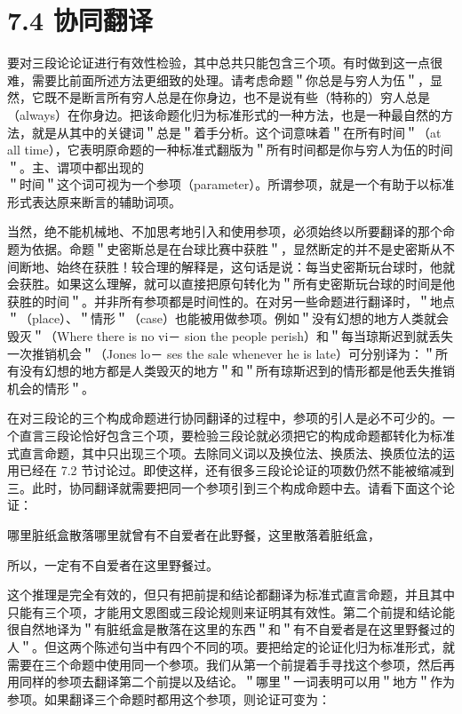 \section*{7.4 协同翻译}
要对三段论论证进行有效性检验，其中总共只能包含三个项。有时做到这一点很难，需要比前面所述方法更细致的处理。请考虑命题＂你总是与穷人为伍＂，显然，它既不是断言所有穷人总是在你身边，也不是说有些（特称的）穷人总是（always）在你身边。把该命题化归为标准形式的一种方法，也是一种最自然的方法，就是从其中的关键词＂总是＂着手分析。这个词意味着＂在所有时间＂（at all time），它表明原命题的一种标准式翻版为＂所有时间都是你与穷人为伍的时间＂。主、谓项中都出现的\\
＂时间＂这个词可视为一个参项（parameter）。所谓参项，就是一个有助于以标准形式表达原来断言的辅助词项。

当然，绝不能机械地、不加思考地引入和使用参项，必须始终以所要翻译的那个命题为依据。命题＂史密斯总是在台球比赛中获胜＂，显然断定的并不是史密斯从不间断地、始终在获胜！较合理的解释是，这句话是说：每当史密斯玩台球时，他就会获胜。如果这么理解，就可以直接把原句转化为＂所有史密斯玩台球的时间是他获胜的时间＂。并非所有参项都是时间性的。在对另一些命题进行翻译时，＂地点＂（place）、＂情形＂（case）也能被用做参项。例如＂没有幻想的地方人类就会毁灭＂（Where there is no vi－ sion the people perish）和＂每当琼斯迟到就丢失一次推销机会＂（Jones lo－ ses the sale whenever he is late）可分别译为：＂所有没有幻想的地方都是人类毁灭的地方＂和＂所有琼斯迟到的情形都是他丢失推销机会的情形＂。

在对三段论的三个构成命题进行协同翻译的过程中，参项的引人是必不可少的。一个直言三段论恰好包含三个项，要检验三段论就必须把它的构成命题都转化为标准式直言命题，其中只出现三个项。去除同义词以及换位法、换质法、换质位法的运用已经在 7.2 节讨论过。即使这样，还有很多三段论论证的项数仍然不能被缩减到三。此时，协同翻译就需要把同一个参项引到三个构成命题中去。请看下面这个论证：

\begin{displayquote}
哪里脏纸盒散落哪里就曾有不自爱者在此野餐，这里散落着脏纸盒，
\end{displayquote}

所以，一定有不自爱者在这里野餐过。

这个推理是完全有效的，但只有把前提和结论都翻译为标准式直言命题，并且其中只能有三个项，才能用文恩图或三段论规则来证明其有效性。第二个前提和结论能很自然地译为＂有脏纸盒是散落在这里的东西＂和＂有不自爱者是在这里野餐过的人＂。但这两个陈述句当中有四个不同的项。要把给定的论证化归为标准形式，就需要在三个命题中使用同一个参项。我们从第一个前提着手寻找这个参项，然后再用同样的参项去翻译第二个前提以及结论。＂哪里＂一词表明可以用＂地方＂作为参项。如果翻译三个命题时都用这个参项，则论证可变为：

